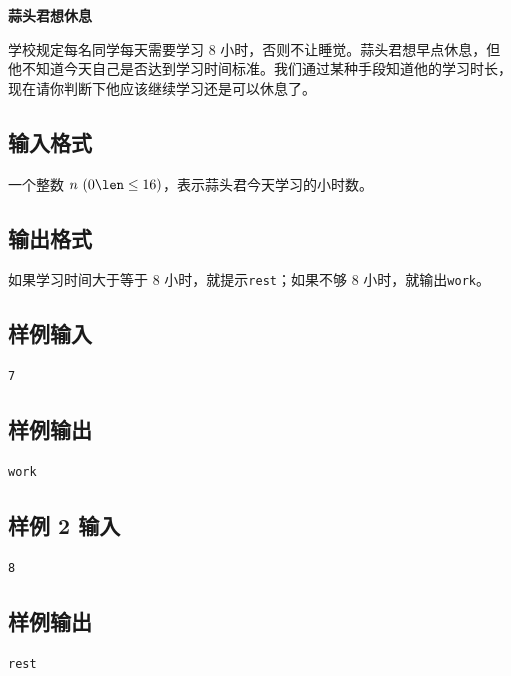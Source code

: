 \documentclass{article}
\newcommand{\problemname}[1]{\begin{center}\Large\bfseries #1\end{center}}
\begin{document}
\problemname{蒜头君想休息}

学校规定每名同学每天需要学习 $8$ 小时，否则不让睡觉。蒜头君想早点休息，但他不知道今天自己是否达到学习时间标准。我们通过某种手段知道他的学习时长，现在请你判断下他应该继续学习还是可以休息了。

\subsection*{输入格式}
一个整数 $n\text{ }(0\len\le16)$，表示蒜头君今天学习的小时数。

\subsection*{输出格式}
如果学习时间大于等于 $8$ 小时，就提示\texttt{rest}；如果不够 $8$ 小时，就输出\texttt{work}。

\subsection*{样例输入}
\begin{verbatim}
7
\end{verbatim}

\subsection*{样例输出}
\begin{verbatim}
work
\end{verbatim}

\subsection*{样例 2 输入}
\begin{verbatim}
8
\end{verbatim}

\subsection*{样例输出}
\begin{verbatim}
rest
\end{verbatim}
\end{document}
